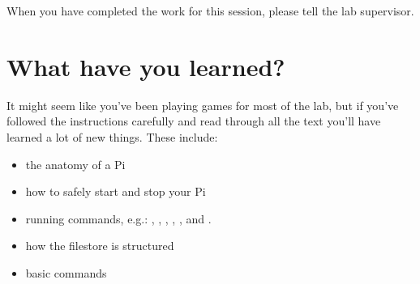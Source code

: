 When you have completed the work for this session, please tell the lab supervisor.

\FloatBarrier
\section{What have you learned?}

It might seem like you've been playing games for most of the lab, but if you've followed the instructions carefully and read through all the text you'll have learned a lot of new things. These include:
\begin{itemize}
\item the anatomy of a Pi
\item how to safely start and stop your Pi
\item running commands, e.g.: , , , , ,   and .
\item how the filestore is structured
\item basic  commands
\end{itemize}




